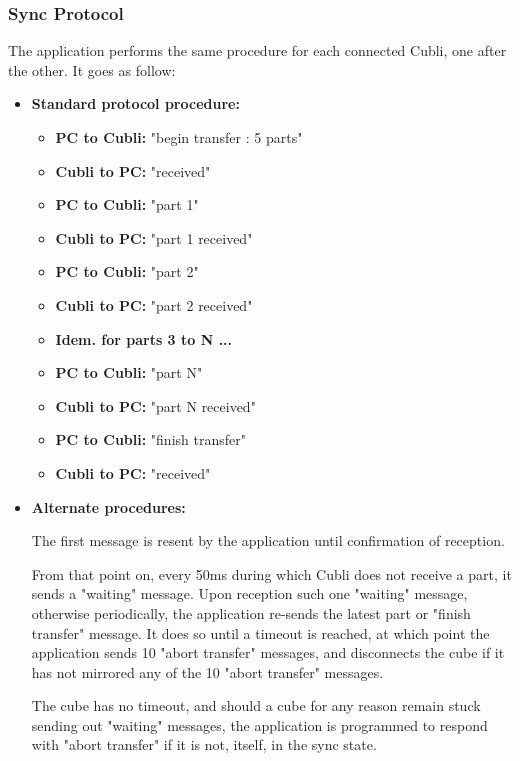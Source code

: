 \subsubsection{Sync Protocol}

The application performs the same procedure for each connected Cubli, one after the other. It goes as follow:

\begin{itemize}
\item[] \textbf{Standard protocol procedure:}

\begin{itemize}
\item[] \textbf{PC to Cubli:} "begin transfer : 5 parts"
\item[] \textbf{Cubli to PC:} "received"
\item[] \textbf{PC to Cubli:} "part 1"
\item[] \textbf{Cubli to PC:} "part 1 received"
\item[] \textbf{PC to Cubli:} "part 2"
\item[] \textbf{Cubli to PC:} "part 2 received"
\item[] \textbf{Idem. for parts 3 to N ...}
\item[] \textbf{PC to Cubli:} "part N"
\item[] \textbf{Cubli to PC:} "part N received"
\item[] \textbf{PC to Cubli:} "finish transfer"
\item[] \textbf{Cubli to PC:} "received"
\end{itemize}

\item[] \textbf{Alternate procedures:}

The first message is resent by the application until confirmation of reception.

From that point on, every 50ms during which Cubli does not receive a part, it sends a "waiting" message. 
Upon reception such one "waiting" message, otherwise periodically, the application re-sends the latest part or "finish transfer" message. It does so until a timeout is reached, at which point the application sends 10 "abort transfer" messages, and disconnects the cube if it has not mirrored any of the 10 "abort transfer" messages.

The cube has no timeout, and should a cube for any reason remain stuck sending out "waiting" messages, the application is programmed to respond with "abort transfer" if it is not, itself, in the sync state.

\end{itemize}

